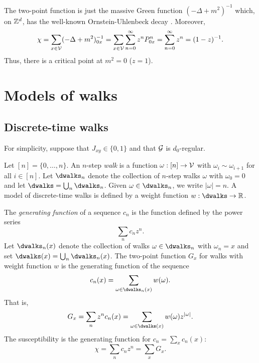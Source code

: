 \begin{example}
The two-point function is just the massive Green function
$(-\Delta + m^2)^{-1}$ which, on ${ {{\mathbb Z}}^d }$, has the well-known Ornstein-Uhlenbeck decay . Moreover,
\begin{equation}
\chi
  =
\sum_{x\in\mathcal{V}} (-\Delta + m^2)^{-1}_{0x}
  =
\sum_{x\in\mathcal{V}} \sum_{n=0}^\infty z^n P^n_{0x}
  =
\sum_{n=0}^\infty z^n
  =
(1 - z)^{-1}.
\end{equation}
Thus, there is a critical point at $m^2 = 0$ ($z = 1$).

\end{example}


\section{Models of walks}

\subsection{Discrete-time walks}

For simplicity, suppose that $J_{xy} \in \{ 0, 1 \}$ and that $\mathcal{G}$ is
$d_0$-regular.

Let $[n] = \{ 0, \ldots, n \}$.
An $n$-step \emph{walk} is a function $\omega : [n] \rightarrow \mathcal{V}$ with
$\omega_i \sim \omega_{i+1}$ for all $i \in [n]$. Let $\dwalks_n$ denote the collection
of $n$-step walks $\omega$ with $\omega_0 = 0$ and let $\dwalks = \bigcup_n \dwalks_n$.
Given $\omega\in\dwalks_n$, we write $|\omega| = n$.
A model of discrete-time walks is defined by a weight function $w : \dwalks \to \R$.

The \emph{generating function} of a sequence $c_n$ is the function defined by
the power series
\begin{equation}
\sum_n c_n z^n.
\end{equation}
Let $\dwalks_n(x)$ denote the collection of walks $\omega\in\dwalks_n$ with $\omega_n = x$
and set $\dwalks(x) = \bigcup_n \dwalks_n(x)$.
The two-point function $G_x$ for walks with weight function $w$ is the generating
function of the sequence
\begin{equation}
c_n(x) = \sum_{\omega\in\dwalks_n(x)} w(\omega).
\end{equation}
That is,
\begin{equation}
G_x = \sum_n z^n c_n(x)
	= \sum_{\omega\in\dwalks(x)} w(\omega) z^{|\omega|}.
\end{equation}
The susceptibility is the generating function for $c_n = \sum_x c_n(x)$:
\begin{equation}
\chi = \sum_n c_n z^n = \sum_x G_x.
\end{equation}

